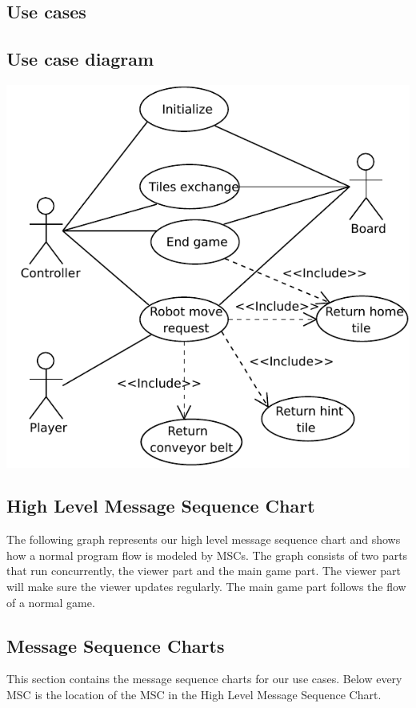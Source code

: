 \subsection{Use cases}
	
\subsection{Use case diagram}
	\includegraphics[width=\linewidth]{usecases/diagram.pdf}	

\subsection{High Level Message Sequence Chart}
	The following graph represents our high level message sequence chart and shows how a normal program flow is modeled by MSCs. The graph consists of two parts that run concurrently, the viewer part and the main game part. The viewer part will make sure the viewer updates regularly. The main game part follows the flow of a normal game.
	
	

\subsection{Message Sequence Charts}
	This section contains the message sequence charts for our use cases. Below every MSC is the location of the MSC in the High Level Message Sequence Chart.

